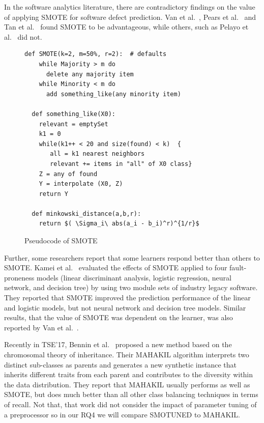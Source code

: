 \documentclass[sigconf]{acmart}
\theoremstyle{break}
\theoremstyle{break}
\newcommand{\sma}{{\sc SMOTE}}
\newcommand{\smb}{{\sc SMOTUNED}}
\begin{document}
In the software analytics literature, there are contradictory findings on
the value of applying {\sma} for software defect prediction.
Van et al.~\cite{van2007experimental}, Pears et al.~\cite{pears2014synthetic} and Tan et al.~\cite{tan2015online} found {\sma} to be advantageous, while others, such as Pelayo et al.~\cite{pelayo2007applying} did not. 

 \begin{figure}\small
\begin{lstlisting}[mathescape,linewidth=2in,frame=n,numbers=none]
  def SMOTE(k=2, m=50%, r=2):  # defaults
    while Majority > m do
      delete any majority item
    while Minority < m do
      add something_like(any minority item)
      
  def something_like(X0): 
    relevant = emptySet
    k1 = 0
    while(k1++ < 20 and size(found) < k)  {
       all = k1 nearest neighbors
       relevant += items in "all" of X0 class}
    Z = any of found
    Y = interpolate (X0, Z)
    return Y
    
  def minkowski_distance(a,b,r): 
    return $( \Sigma_i\ abs(a_i - b_i)^r)^{1/r}$
\end{lstlisting} 
\vspace{-0.2cm}
\caption{Pseudocode of SMOTE}
\label{fig:pseudocode} 
\vspace{-0.3cm}
\end{figure}

Further, some researchers report that some learners respond better than others to {\sma}. Kamei et al.~\cite{kamei2007effects} evaluated the effects of {\sma} applied to  four fault-proneness models
(linear discriminant analysis, logistic regression, neural network, and decision tree) by
using two module sets of industry legacy software. They reported that {\sma} improved the prediction performance of the linear and logistic models, but not neural network and decision tree models. Similar results, that the value of {\sma} was dependent on the learner,
was also reported by Van et al.~\cite{van2007experimental}.

Recently in TSE'17, Bennin et al.~\cite{bennin2017mahakil}  proposed a new method based on the chromosomal theory of inheritance. 
Their MAHAKIL algorithm interprets two distinct sub-classes as parents and generates a new synthetic instance that inherits different traits from each parent and contributes to the diversity within the data distribution.
They report that MAHAKIL usually performs as well as  {\sma}, but
does much better than all   other class balancing techniques in terms of recall.
Not that, that work did not  consider the impact of parameter tuning of a preprocessor so in our RQ4 we will compare {\smb} to MAHAKIL.
\end{document}
